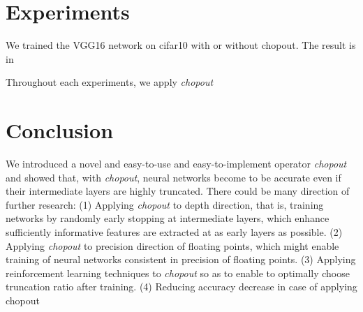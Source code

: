 \documentclass{article}
\begin{document}
    \section{Experiments}
    \label{experiments}
    
    We trained the VGG16 network on cifar10 with or without chopout. The result is in 
    
    Throughout each experiments, we apply \textit{chopout}

    \section{Conclusion}
    \label{Discussion}
    We introduced a novel and easy-to-use and easy-to-implement operator \textit{chopout} and showed that, with \textit{chopout}, neural networks become to be accurate even if their intermediate layers are highly truncated. 
    There could be many direction of further research:
    (1) Applying \textit{chopout} to depth direction, that is, training networks by randomly early stopping at intermediate layers, which enhance sufficiently informative features are extracted at as early layers as possible.
    (2) Applying \textit{chopout} to precision direction of floating points, which might enable training of neural networks consistent in precision of floating points.
    (3) Applying reinforcement learning techniques to \textit{chopout} so as to enable to optimally choose truncation ratio after training.
    (4) Reducing accuracy decrease in case of applying chopout
    
    
    
        
    
    
    
    
\end{document}
